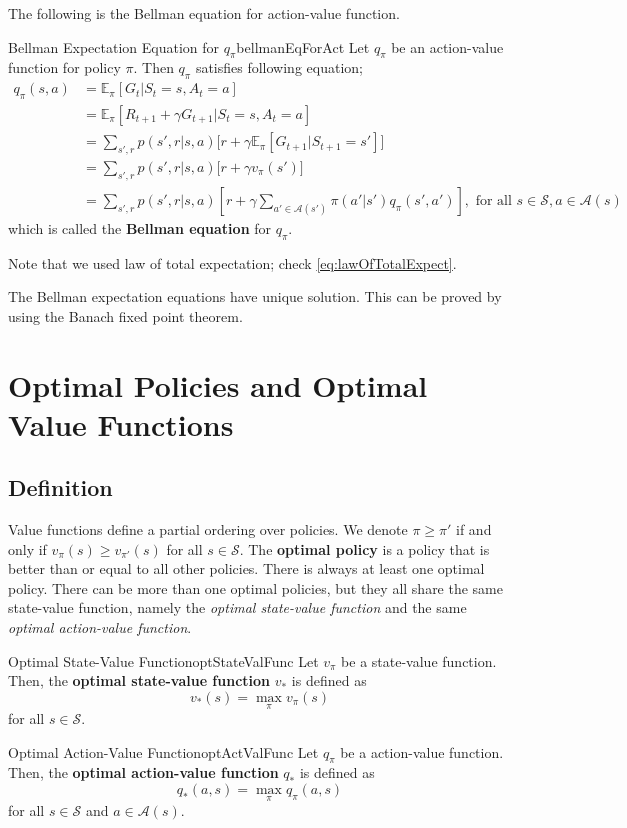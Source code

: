 \documentclass[../../main.tex]{subfiles}
\begin{document}
        The following is the Bellman equation for action-value function.
        \begin{thm}{Bellman Expectation Equation for $q_\pi$}{bellmanEqForAct}
            Let $q_\pi$ be an action-value function for policy $\pi$. Then $q_\pi$ satisfies following equation;
            \begin{align}
                q_\pi(s,a) &= \mathbb{E}_\pi[G_t|S_t=s, A_t=a]
                \\ &= \mathbb{E}_\pi[R_{t+1} + \gamma G_{t+1} | S_t = s, A_t = a]
                \\ &= \sum_{s', r} p(s',r|s,a) \big[ r + \gamma \mathbb{E}_\pi[G_{t+1}|S_{t+1}=s'] \big]
                \\ &= \sum_{s', r} p(s',r|s,a) \big[ r + \gamma v_\pi(s')\big]
                \\ &= \sum_{s', r} p(s',r|s,a) \left[ r + \gamma \sum_{a' \in \mathcal{A}(s')} \pi(a'|s') q_\pi(s',a') \right], \text{ for all } s \in \mathcal{S}, a \in \mathcal{A}(s)
            \end{align}
            which is called the \textbf{Bellman equation} for $q_\pi$.
        \end{thm}
        Note that we used law of total expectation; check \ref{eq:lawOfTotalExpect}.

        The Bellman expectation equations have unique solution. This can be proved by using the Banach fixed point theorem.

\section{Optimal Policies and Optimal Value Functions}
    \subsection{Definition}
        Value functions define a partial ordering over policies. We denote $\pi \geq \pi'$ if and only if $v_\pi(s) \geq v_{\pi'}(s)$ for all $s \in \mathcal{S}$.
        The \textbf{optimal policy} is a policy that is better than or equal to all other policies. There is always at least one optimal policy.
        There can be more than one optimal policies, but they all share the
        same state-value function, namely the \emph{optimal state-value function} and the same \emph{optimal action-value function}.
        \begin{defn}{Optimal State-Value Function}{optStateValFunc}
            Let $v_\pi$ be a state-value function. Then, the \textbf{optimal state-value function} $v_*$ is defined as
            \[
            v_*(s) = \max_\pi{v_\pi(s)}
            \]
            for all $s \in \mathcal{S}$.
        \end{defn}
        \begin{defn}{Optimal Action-Value Function}{optActValFunc}
            Let $q_\pi$ be a action-value function. Then, the \textbf{optimal action-value function} $q_*$ is defined as
            \[
            q_*(a,s) = \max_\pi{q_\pi(a,s)}
            \]
            for all $s \in \mathcal{S}$ and $a \in \mathcal{A}(s)$.
        \end{defn}
\end{document}
